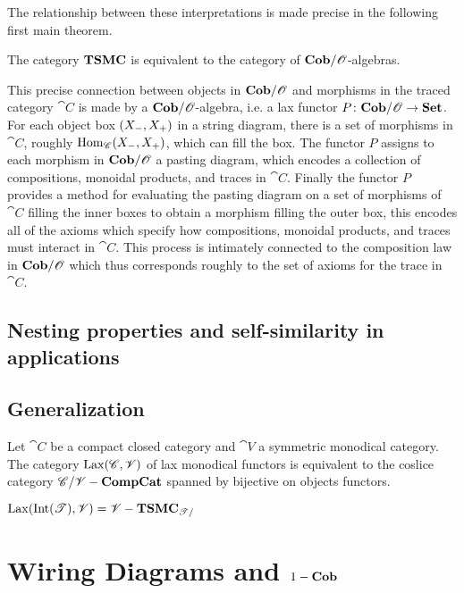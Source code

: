The relationship between these interpretations is made precise in the following first main theorem.
\begin{theorem}
 The category $\mathbf{TSMC}$ is equivalent to the category of $\mathbf{Cob}/\mathscr{O}$-algebras.
\end{theorem}

This precise connection between objects in $\mathbf{Cob}/\mathscr{O}$ and morphisms in the traced category $\cat{C}$ is made by a $\mathbf{Cob}/\mathscr{O}$-algebra, i.e. a lax functor $P\colon\mathbf{Cob}/\mathscr{O}\to\mathbf{Set}$. For each object box $({X_-},{X_+})$ in a string diagram, there is a set of morphisms in $\cat{C}$, roughly $\operatorname{Hom}_{\mathscr{C}}({X_-},{X_+})$, which can fill the box. The functor $P$ assigns to each morphism in $\mathbf{Cob}/\mathscr{O}$ a pasting diagram, which encodes a collection of compositions, monoidal products, and traces in $\cat{C}$.  Finally the functor $P$ provides a method for evaluating the pasting diagram on a set of morphisms of $\cat{C}$ filling the inner boxes to obtain a morphism filling the outer box, this encodes all of the axioms which specify how compositions, monoidal products, and traces must interact in $\cat{C}$. This process is intimately connected to the composition law in $\mathbf{Cob}/\mathscr{O}$ which thus corresponds roughly to the set of axioms for the trace in $\cat{C}$.

\section{Nesting properties and self-similarity in applications}





\section{Generalization}

\begin{theorem}
 Let $\cat{C}$ be a compact closed category and $\cat{V}$ a symmetric monodical category.  The category $\operatorname{Lax}(\mathscr{C},\mathscr{V})$ of lax monodical functors is equivalent to the coslice category $\mathscr{C}/\mathscr{V}-\mathbf{CompCat}$ spanned by bijective on objects functors.
\end{theorem}
\begin{corollary}
 $\operatorname{Lax}(\operatorname{Int}(\mathscr{T}),\mathscr{V})=\mathscr{V}-\mathbf{TSMC}_{\mathscr{T}/}$
\end{corollary}

\chapter{Wiring Diagrams and $1-\mathbf{Cob}$}
